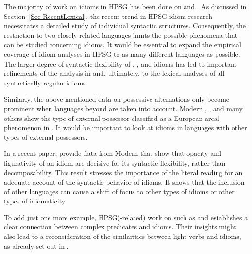 \documentclass[output=paper
	        ,collection
	        ,collectionchapter
 	        ,biblatex
                ,babelshorthands
                ,newtxmath
                ,draftmode
                ,colorlinks, citecolor=brown
]{langscibook}
\begin{document}
The majority of work on idioms in HPSG has been done on  and . 
As discussed in Section~\ref{Sec-RecentLexical}, the recent trend in HPSG idiom research necessitates a detailed study of individual syntactic structures. 
Consequently, the restriction to two closely related languages limits the possible phenomena that can be studied concerning idioms. 
It would be essential to expand the empirical coverage of idiom analyses in HPSG to as many different languages as possible. 
The larger degree of syntactic flexibility of , , and  idioms \citep{Ruwet:91,NSW94a,Schenk:95} has led to important refinements of the analysis in \citet{NSW94a} and, ultimately, to the lexical analyses of all syntactically regular idioms. 

Similarly, the above-mentioned data on possessive alternations only become prominent when languages beyond  are taken into account. Modern , , and many others
show the type of external possessor classified as a European areal phenomenon in \citet{Haspelmath:99}. 
It would be important to look at idioms in languages with other types of external possessors.


In a recent paper, \citet{Sheinfux:al:19} provide data from Modern  that show that opacity and figurativity of an idiom are decisive for its syntactic flexibility, rather than decomposability.
This result stresses the importance of the literal reading for an adequate account of the syntactic behavior of idioms. 
%
It shows that the inclusion of other languages can cause a shift of focus to other types of idioms or other types of idiomaticity. 

To add just one more example, HPSG(-related) work on  such as \citet{MuellerPersian} and \citet{Samvelian:Faghiri:16} establishes a clear connection between complex predicates and idioms. 
Their insights might also lead to a reconsideration of the similarities between light verbs and idioms, as already set out in \citet{KE94a}.



\end{document}

